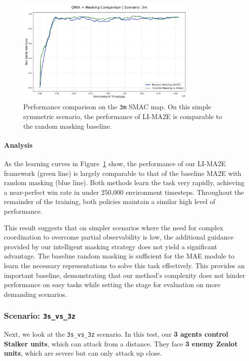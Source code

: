 \begin{figure}[H]
    \centering
    \includegraphics[width=0.8\textwidth]{images_pfe/results_li-ma2e/comparison_plot_3m.png}
    \caption{Performance comparison on the \texttt{3m} SMAC map. On this simple symmetric scenario, the performance of LI-MA2E is comparable to the random masking baseline.}
    \label{fig:3m}
\end{figure}

\paragraph{Analysis}
As the learning curves in Figure~\ref{fig:3m} show, the performance of our LI-MA2E framework (green line) is largely comparable to that of the baseline MA2E with random masking (blue line). Both methods learn the task very rapidly, achieving a near-perfect win rate in under 250,000 environment timesteps. Throughout the remainder of the training, both policies maintain a similar high level of performance.

This result suggests that on simpler scenarios where the need for complex coordination to overcome partial observability is low, the additional guidance provided by our intelligent masking strategy does not yield a significant advantage. The baseline random masking is sufficient for the MAE module to learn the necessary representations to solve this task effectively. This provides an important baseline, demonstrating that our method's complexity does not hinder performance on easy tasks while setting the stage for evaluation on more demanding scenarios.

\subsubsection{Scenario: \texttt{3s\_vs\_3z}}
Next, we look at the \texttt{3s\_vs\_3z} scenario. In this test, our \textbf{3 agents control Stalker units}, which can attack from a distance. They face \textbf{3 enemy Zealot units}, which are severe but can only attack up close.

